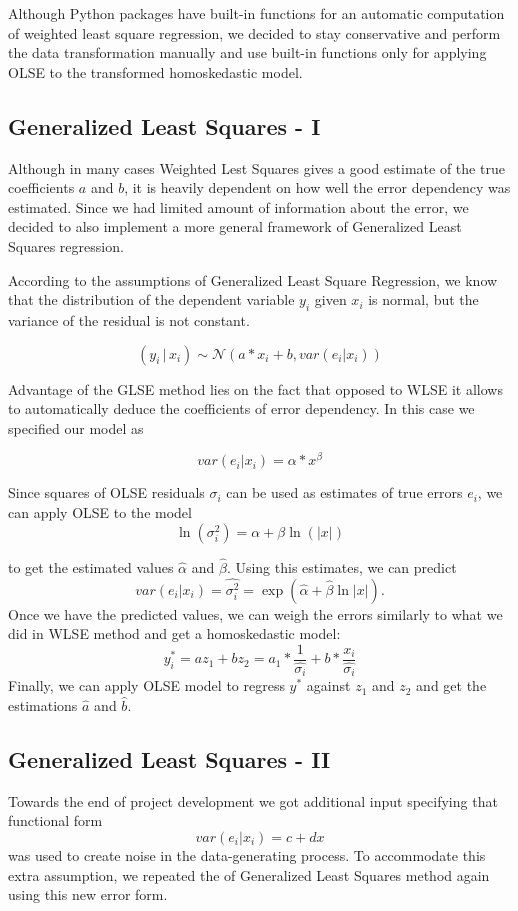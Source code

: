 \documentclass[letter,12pt]{article} %
\begin{document}
	Although Python packages have built-in functions for an automatic computation of weighted least square regression, we decided to stay conservative and perform the data transformation manually and use built-in functions only for applying OLSE to the transformed homoskedastic model.
	
	\subsection*{Generalized Least Squares - I}
	Although in many cases Weighted Lest Squares gives a good estimate of the true coefficients $a$ and $b$, it is heavily dependent on how well the error dependency was estimated. Since we had limited amount of information about the error, we decided to also implement a more general framework of Generalized Least Squares regression.
	
	According to the assumptions of Generalized Least Square Regression, we know that the distribution of the dependent variable $y_i$ given $x_i$ is normal, but the variance of the residual is not constant.
	
	$$(y_i \, | \, x_i) \sim \mathcal{N}(a*x_i + b, var(e_i | x_i))$$
	
	Advantage of the GLSE method lies on the fact that opposed to WLSE it allows to automatically deduce the coefficients of error dependency. In this case we specified our model as
	
	$$
	var(e_i | x_i) = \alpha*x^{\beta}
	$$
	
	Since squares of OLSE residuals $\sigma_i$ can be used as estimates of true errors $e_i$, we can apply OLSE to the model
	$$
	\ln(\sigma^2_i) = \alpha + \beta \ln(|x|)
	$$
	
	to get the estimated values $\hat{\alpha}$ and $\hat{\beta}$. Using this estimates, we can predict 
	$$
	var(e_i | x_i) = \hat{\sigma^2_i} = \exp{(\hat{\alpha} + \hat{\beta} \ln|x|)}.
	$$
	Once we have the predicted values, we can weigh the errors similarly to what we did in  WLSE method and get a homoskedastic model:
	$$
	y_i^* = a z_1 + bz_2 = a_1 * \frac{1}{\hat{\sigma_i}} + b  * \frac{x_i}{\hat{\sigma_i}}
	$$
	Finally, we can apply OLSE model to regress $y^*$ against $z_1$ and $z_2$ and get the 
	estimations $\hat{a}$ and $\hat{b}$.
	
	\subsection*{Generalized Least Squares - II}
	Towards the end of project development we got additional input specifying that functional form 
	$$
	var(e_i | x_i) = c + dx
	$$
	was used to create noise in the data-generating process. To accommodate this extra assumption, we repeated the of Generalized Least Squares method again using this new error form.
	
\end{document}
